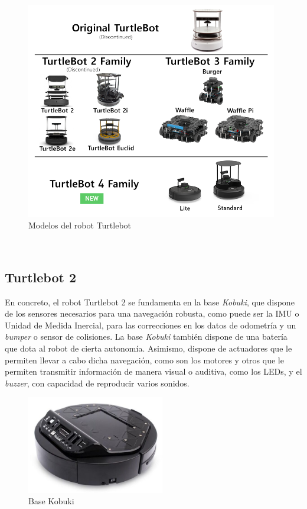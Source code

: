 \begin{figure} [h!]
  \begin{center}
    \includegraphics[width=11cm]{figs/turtlebot_family}
  \end{center}
  \caption{Modelos del robot Turtlebot \citep{turtlebot4}}
  \label{fig:turtlebots}
\end{figure}\

\subsection{Turtlebot 2}
\label{sec:turtlebot2}

En concreto, el robot Turtlebot 2 se fundamenta en la base \textit{Kobuki}, que
dispone de los sensores necesarios para una navegación robusta, como puede ser
la IMU o Unidad de Medida Inercial, para las correcciones en los datos de
odometría y un \textit{bumper} o sensor de colisiones.
La base \textit{Kobuki} también dispone de una batería que dota al robot de
cierta autonomía.
Asimismo, dispone de actuadores que le permiten llevar a cabo dicha navegación,
como son los motores y otros que le permiten transmitir información de manera
visual o auditiva, como los LEDs, y el \textit{buzzer}, con capacidad de
reproducir varios sonidos.
\\

\begin{figure} [h!]
  \begin{center}
    \includegraphics[width=6cm]{figs/kobuki_base}
  \end{center}
  \caption{Base Kobuki \citep{kobuki_base}}
  \label{fig:base_kobuki}
\end{figure}\

